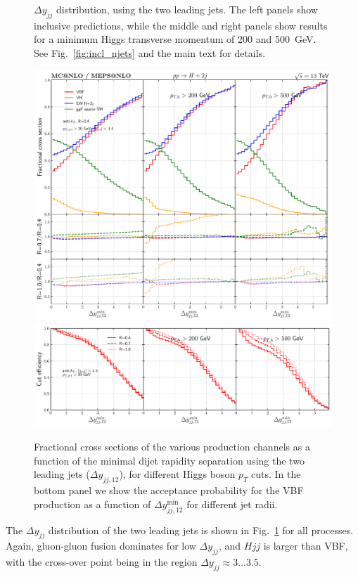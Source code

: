 \documentclass[10pt,prd,fleqn,superscriptaddress,notitlepage,nofootinbib,preprintnumbers,nobalancelastpage]{revtex4-1}
\newcommand{\VBF}{VBF\xspace}
\begin{document}
\begin{figure}[p]
\begin{minipage}{.2925\textwidth}
  \end{minipage}
\caption{$\Delta y_{jj}$ distribution, using the two leading jets.
The left panels show inclusive predictions, while the middle and right panels
show results for a minimum Higgs transverse momentum of 200 and 500~GeV.
See Fig.~\ref{fig:incl_njets} and the main text for details.}
\label{fig:incl_delta_y_jj12}
\end{figure}
\begin{figure}[t]
  \centering
  \includegraphics[width=.65\textwidth]{figures/vbf/delta_y_jj12.pdf}
  \includegraphics[width=.65\textwidth]{figures/vbf/delta_y_jj12_frac.pdf}
\caption{Fractional cross sections of the various production channels as a function of the minimal dijet rapidity separation using the two leading jets ($\Delta y_{jj,12}$), for different Higgs boson $p_T$ cuts.
In the bottom panel we show the acceptance probability for the \VBF{} production as a function of $\Delta y_{jj,12}^{\min}$ for different jet radii.
}
\label{fig:incl_delta_y_jj12_fraction}
\end{figure}
The $\Delta y_{jj}$ distribution of the two leading jets is shown in Fig.~\ref{fig:incl_delta_y_jj12} for all processes.  Again, gluon-gluon fusion dominates for low $\Delta y_{jj}$, and $Hjj$ is larger than \VBF, with the cross-over point being in the region $\Delta y_{jj} \approx 3\ldots 3.5$.
\end{document}
